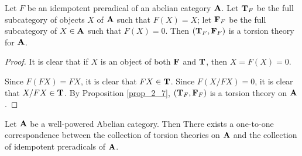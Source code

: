 \begin{prop}
Let $F$ be an idempotent preradical of an abelian category 
$\mathbf{A}$. Let $\mathbf{T}_F$ be the full subcategory of objects $X$
of $\mathbf{A}$ such that $F(X) = X$; let $\mathbf{F}_F$ be the full
subcategory of $X \in \mathbf{A}$ such that $F(X) = 0$. Then $(\mathbf{T}_F,
\mathbf{F}_F)$ is a torsion theory for $\mathbf{A}$.
\end{prop}

\begin{proof}
It is clear that if $X$ is an object of both $\mathbf{F}$ and $\mathbf{T}$,
then $X = F(X) = 0$.

Since $F(FX) = FX$, it is clear that $FX \in \mathbf{T}$. Since 
$F(X/FX) = 0$, it is clear that $X/FX \in \mathbf{T}$. By Proposition
\ref{prop_2_7}, $(\mathbf{T}_F, \mathbf{F}_F)$ is a torsion theory on
$\mathbf{A}$.
\end{proof}

\begin{thm} Let $\mathbf{A}$ be a well-powered Abelian category. Then
There exists a one-to-one correspondence between the collection 
of torsion theories on $\mathbf{A}$ and the collection of idempotent
preradicals of $\mathbf{A}$.
\end{thm}
